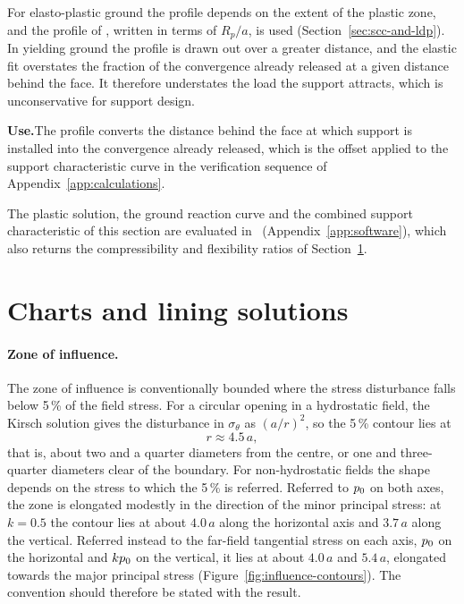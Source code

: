 For elasto-plastic ground the profile depends on the extent of the plastic
zone, and the profile of \citet{vlachopoulos2009ldp}, written in terms of
$R_p/a$, is used (Section~\ref{sec:scc-and-ldp}). In yielding ground the
profile is drawn out over a greater distance, and the elastic fit overstates
the fraction of the convergence already released at a given distance behind
the face. It therefore understates the load the support attracts, which is
unconservative for support design.

\noindent\textbf{Use.}\enspace The profile converts the distance behind the
face at which support is installed into the convergence already released,
which is the offset applied to the support characteristic curve in the
verification sequence of Appendix~\ref{app:calculations}.

The plastic solution, the ground reaction curve and the combined support
characteristic of this section are evaluated in \companionname\
(Appendix~\ref{app:software}), which also returns the compressibility and
flexibility ratios of Section~\ref{sec:charts-and-lining-solutions}.

\section{Charts and lining solutions}
\label{sec:charts-and-lining-solutions}

\paragraph{Zone of influence.}
The zone of influence is conventionally bounded where the stress disturbance
falls below 5\,\% of the field stress. For a circular opening in a hydrostatic
field, the Kirsch solution gives the disturbance in $\sigma_\theta$ as
$(a/r)^2$, so the 5\,\% contour lies at
\[
r \approx 4.5\,a ,
\]
that is, about two and a quarter diameters from the centre, or one and
three-quarter diameters clear of the boundary. For non-hydrostatic fields the
shape depends on the stress to which the 5\,\% is referred. Referred to
$p_0$ on both axes, the zone is elongated modestly in the direction of the
minor principal stress: at $k = 0.5$ the contour lies at about $4.0\,a$ along
the horizontal axis and $3.7\,a$ along the vertical. Referred instead to the
far-field tangential stress on each axis, $p_0$ on the horizontal and
$kp_0$ on the vertical, it lies at about $4.0\,a$ and $5.4\,a$, elongated
towards the major principal stress (Figure~\ref{fig:influence-contours}). The
convention should therefore be stated with the result.

